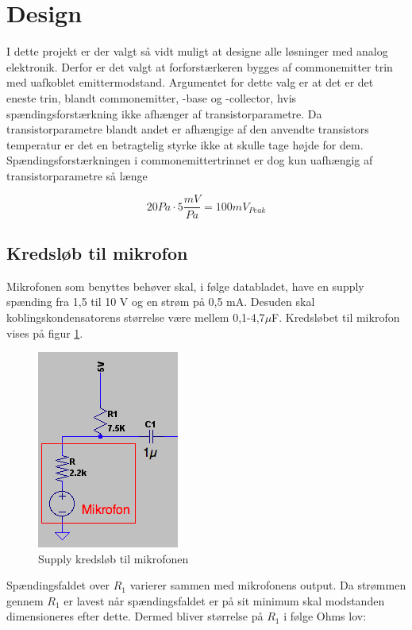 \section{Design}
I dette projekt er der valgt så vidt muligt at designe alle løsninger med analog elektronik. Derfor er det valgt at forforstærkeren bygges af commonemitter trin med uafkoblet emittermodstand. 
Argumentet for dette valg er at det er det eneste trin, blandt commonemitter, -base og -collector, hvis spændingsforstærkning ikke afhænger af transistorparametre. Da transistorparametre blandt andet er afhængige af den anvendte transistors temperatur er det en betragtelig styrke ikke at skulle tage højde for dem. Spændingsforstærkningen i commonemittertrinnet er dog kun uafhængig af transistorparametre så længe 



\begin{equation}
20 Pa \cdot 5 \frac{mV}{Pa} = 100 mV_{Peak}
\label{eq:mikrofonoutput}
\end{equation}

\subsection*{Kredsløb til mikrofon}

Mikrofonen som benyttes behøver skal, i følge databladet, have en supply spænding fra 1,5 til 10 V og en strøm på 0,5 mA. Desuden skal koblingskondensatorens størrelse være mellem 0,1-4,7$\mu$F. Kredsløbet til mikrofon vises på figur \ref{fig:mikrofonkreds}. 

\begin{figure}[h]
\centering
\includegraphics[scale=.6]{teknisk/forforstaerker/mikrofonkreds.png}
\caption{Supply kredsløb til mikrofonen}
\label{fig:mikrofonkreds}
\end{figure}

Spændingsfaldet over $R_1$ varierer sammen med mikrofonens output. Da strømmen gennem $R_1$ er lavest når spændingsfaldet er på sit minimum skal modstanden dimensioneres efter dette. Dermed bliver størrelse på $R_1$ i følge Ohms lov:

